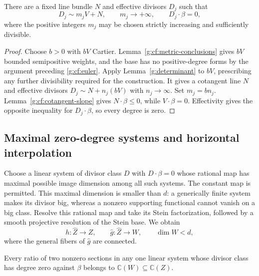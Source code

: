 \begin{lemma}\label{g:cf:effective-sequence}
There are a fixed line bundle $N$ and effective divisors $D_j$
such that
\begin{equation}\label{g:cf:divisor-sequence}
 D_j\sim m_jV+N,\qquad
 m_j\longrightarrow+\infty,\qquad
 D_j\cdot\beta=0,
\end{equation}
where the positive integers $m_j$ may be chosen strictly increasing
and sufficiently divisible.
\end{lemma}

\begin{proof}
Choose $b>0$ with $bV$ Cartier. Lemma~\ref{g:cf:metric-conclusions}
gives $bV$ bounded semipositive weights, and the base has no
positive-degree forms by the argument preceding \eqref{g:cf:euler}.
Apply Lemma~\ref{g:determinant} to $bV$, prescribing any further
divisibility required for the construction. It gives a cotangent line
$N$ and effective divisors $D_j\sim N+n_j(bV)$ with $n_j\to\infty$.
Set $m_j=bn_j$. Lemma~\ref{g:cf:cotangent-slope} gives
$N\cdot\beta\leq0$, while $V\cdot\beta=0$. Effectivity gives the
opposite inequality for $D_j\cdot\beta$, so every degree is zero.
\end{proof}

\subsection{Maximal zero-degree systems and horizontal interpolation}
\label{g:cf:zero-systems}

Choose a linear system of divisor class $D$ with
$D\cdot\beta=0$ whose rational map has maximal possible
image dimension among all such systems.  The constant
map is permitted.  This maximal dimension is smaller
than $d$: a generically finite system makes its divisor
big, whereas a nonzero supporting functional cannot
vanish on a big class.  Resolve this rational map and
take its Stein factorization, followed by a smooth
projective resolution of the Stein base.  We obtain
\[
 h:\widehat Z\longrightarrow Z,\qquad
 \widehat g:\widehat Z\longrightarrow W,
 \qquad \dim W<d,
\]
where the general fibers of $\widehat g$ are connected.

\begin{lemma}\label{g:cf:maximal-field}
Every ratio of two nonzero sections in any one linear
system whose divisor class has degree zero against
$\beta$ belongs to $\mathbb C(W)\subseteq\mathbb C(Z)$.
\end{lemma}

